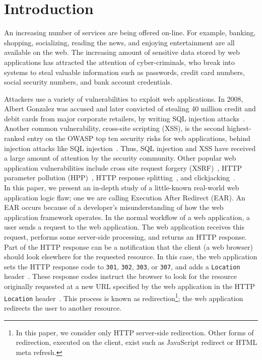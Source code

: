 



\section{Introduction}
An increasing number of services are being offered on-line. For
example, banking, shopping, socializing, reading the news, and
enjoying entertainment are all available on the web. The increasing amount
of sensitive data stored by web applications has
attracted the attention of cyber-criminals, who break into systems to
steal valuable information such as passwords, credit card numbers,
social security numbers, and bank account credentials.

Attackers use a variety of vulnerabilities to exploit web applications. In
2008, Albert Gonzalez was accused and later convicted of stealing 40
million credit and debit cards from major corporate retailers, by writing
SQL injection attacks~\cite{gonzalez08:indictment,ortiz10:outcome}. Another
common vulnerability, cross-site scripting (XSS), is the second
highest-ranked entry on the OWASP top ten security risks for web
applications, behind injection attacks like SQL
injection~\cite{owasptopten}. Thus, SQL injection and XSS have received a
large amount of attention by the security community. Other popular web
application vulnerabilities include cross site request forgery
(XSRF)~\cite{barth08:csrf}, HTTP parameter pollution
(HPP)~\cite{carettoni09:hpp,balduzzi11:hpp}, HTTP response
splitting~\cite{klein04:http-response-splitting}, and
clickjacking~\cite{hansen08:clickjacking,balduzzi10:clickjacking}. 
\\

\noindent{}In this paper, we present an in-depth study of a little-known
real-world web application logic flaw; one we are calling Execution
After Redirect (EAR). An EAR occurs because of a developer's
misunderstanding of how the web application framework operates. In the
normal workflow of a web application, a user sends a request to the web
application. The web application receives this request, performs some
server-side processing, and returns an HTTP response. Part of the HTTP
response can be a notification that the client (a web browser) should look
elsewhere for the requested resource. In this case, the web application
sets the HTTP response code to \texttt{301}, \texttt{302},
\texttt{303}, or \texttt{307}, and adds a \texttt{Location}
header~\cite{fielding99:http11statuscode}. These response codes instruct
the browser to look for the resource originally requested at a new URL
specified by the web application in the HTTP \texttt{Location}
header~\cite{fielding99:http11location}. This process is known as
redirection\footnote{In this paper, we consider only HTTP server-side
  redirection. Other forms of redirection, executed on the client, exist
  such as JavaScript redirect or HTML meta refresh.}; the web application
redirects the user to another resource.

